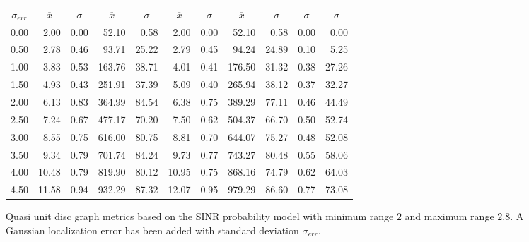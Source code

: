 \documentclass{article}
\begin{document}
\begin{figure}[h]
\begin{center}
\begin{tabular}{|r|rr|rr|rr|rr|rr|}
\hline
\multicolumn{1}{|c|}{$\sigma_{err}$} & \multicolumn{1}{|c}{$\overline{x}$} & \multicolumn{1}{c|}{$\sigma$} & \multicolumn{1}{|c}{$\overline{x}$} & \multicolumn{1}{c|}{$\sigma$} & \multicolumn{1}{|c}{$\overline{x}$} & \multicolumn{1}{c|}{$\sigma$} & \multicolumn{1}{|c}{$\overline{x}$} & \multicolumn{1}{c|}{$\sigma$} & \multicolumn{1}{|c}{$\sigma$} & \multicolumn{1}{c|}{$\sigma$}\\
0.00 &  2.00 & 0.00 &  52.10 &  0.58 &  2.00 & 0.00 &  52.10 &  0.58 & 0.00 & 0.00\\
0.50 &  2.78 & 0.46 &  93.71 & 25.22 &  2.79 & 0.45 &  94.24 & 24.89 & 0.10 & 5.25\\
1.00 &  3.83 & 0.53 & 163.76 & 38.71 &  4.01 & 0.41 & 176.50 & 31.32 & 0.38 & 27.26\\
1.50 &  4.93 & 0.43 & 251.91 & 37.39 &  5.09 & 0.40 & 265.94 & 38.12 & 0.37 & 32.27\\
2.00 &  6.13 & 0.83 & 364.99 & 84.54 &  6.38 & 0.75 & 389.29 & 77.11 & 0.46 & 44.49\\
2.50 &  7.24 & 0.67 & 477.17 & 70.20 &  7.50 & 0.62 & 504.37 & 66.70 & 0.50 & 52.74\\
3.00 &  8.55 & 0.75 & 616.00 & 80.75 &  8.81 & 0.70 & 644.07 & 75.27 & 0.48 & 52.08\\
3.50 &  9.34 & 0.79 & 701.74 & 84.24 &  9.73 & 0.77 & 743.27 & 80.48 & 0.55 & 58.06\\
4.00 & 10.48 & 0.79 & 819.90 & 80.12 & 10.95 & 0.75 & 868.16 & 74.79 & 0.62 & 64.03\\
4.50 & 11.58 & 0.94 & 932.29 & 87.32 & 12.07 & 0.95 & 979.29 & 86.60 & 0.77 & 73.08\\
\hline
\end{tabular}
\caption{Quasi unit disc graph metrics based on the SINR probability model with minimum range $2$ and maximum range $2.8$. A Gaussian localization error has been added with standard deviation $\sigma_{err}$.}
\label{exp_quasi_e}
\end{center}
\end{figure}
\end{document}
